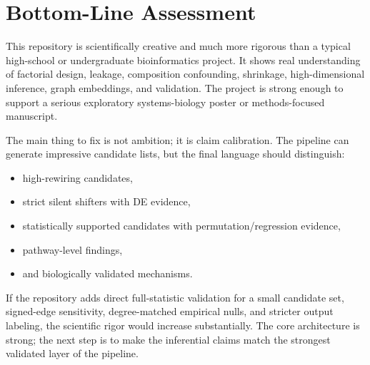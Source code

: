 \documentclass[11pt]{article}
\begin{document}
\section{Bottom-Line Assessment}

This repository is scientifically creative and much more rigorous than a typical high-school or undergraduate bioinformatics project.  It shows real understanding of factorial design, leakage, composition confounding, shrinkage, high-dimensional inference, graph embeddings, and validation.  The project is strong enough to support a serious exploratory systems-biology poster or methods-focused manuscript.

The main thing to fix is not ambition; it is claim calibration.  The pipeline can generate impressive candidate lists, but the final language should distinguish:
\begin{itemize}[leftmargin=1.5em]
    \item high-rewiring candidates,
    \item strict silent shifters with DE evidence,
    \item statistically supported candidates with permutation/regression evidence,
    \item pathway-level findings,
    \item and biologically validated mechanisms.
\end{itemize}

If the repository adds direct full-statistic validation for a small candidate set, signed-edge sensitivity, degree-matched empirical nulls, and stricter output labeling, the scientific rigor would increase substantially.  The core architecture is strong; the next step is to make the inferential claims match the strongest validated layer of the pipeline.
\end{document}

